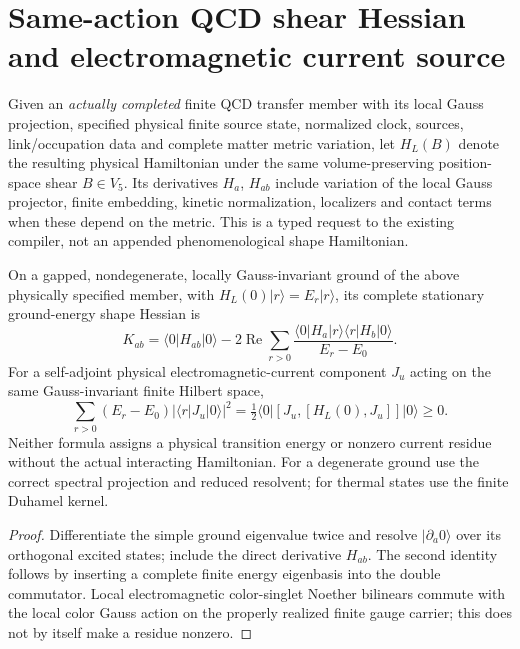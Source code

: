 \documentclass[12pt,a4paper]{article}
\begin{document}
\section{Same-action QCD shear Hessian and electromagnetic current source}
\label{bh:berger:v117:p7a:shear-source}
\begin{definition}
\label{bh:berger:v117:p7a:source-data}
Given an \emph{actually completed} finite QCD transfer member with its
local Gauss projection, specified physical finite source state,
normalized clock, sources, link/occupation data and complete matter
metric variation, let $H_L(B)$ denote the resulting physical
Hamiltonian under the same volume-preserving position-space shear
$B\in V_5$. Its derivatives $H_a$, $H_{ab}$ include variation of the
local Gauss projector, finite embedding, kinetic normalization,
localizers and contact terms when these depend on the metric.
This is a typed request to the existing compiler, not an appended
phenomenological shape Hamiltonian.
\end{definition}
\begin{proposition}
\label{bh:berger:v117:p7a:source-hessian}
On a gapped, nondegenerate, locally Gauss-invariant ground of the
above physically specified member, with $H_L(0)|r\rangle=E_r|r\rangle$,
its complete stationary ground-energy shape Hessian is
\[
 K_{ab}=\langle0|H_{ab}|0\rangle
 -2\operatorname{Re}\sum_{r>0}
   \frac{\langle0|H_a|r\rangle
         \langle r|H_b|0\rangle}{E_r-E_0}.
\]
For a self-adjoint physical electromagnetic-current component $J_u$
acting on the same Gauss-invariant finite Hilbert space,
\[
 \sum_{r>0}(E_r-E_0)|\langle r|J_u|0\rangle|^2
 =\tfrac12\langle0|[J_u,[H_L(0),J_u]]|0\rangle\ge0.
\]
Neither formula assigns a physical transition energy or nonzero
current residue without the actual interacting Hamiltonian.
For a degenerate ground use the correct spectral projection and
reduced resolvent; for thermal states use the finite Duhamel kernel.
\end{proposition}
\begin{proof}
Differentiate the simple ground eigenvalue twice and resolve
$|\partial_a0\rangle$ over its orthogonal excited states; include
the direct derivative $H_{ab}$. The second identity follows by
inserting a complete finite energy eigenbasis into the double
commutator. Local electromagnetic color-singlet Noether bilinears
commute with the local color Gauss action on the properly realized
finite gauge carrier; this does not by itself make a residue nonzero.
\end{proof}
\end{document}
